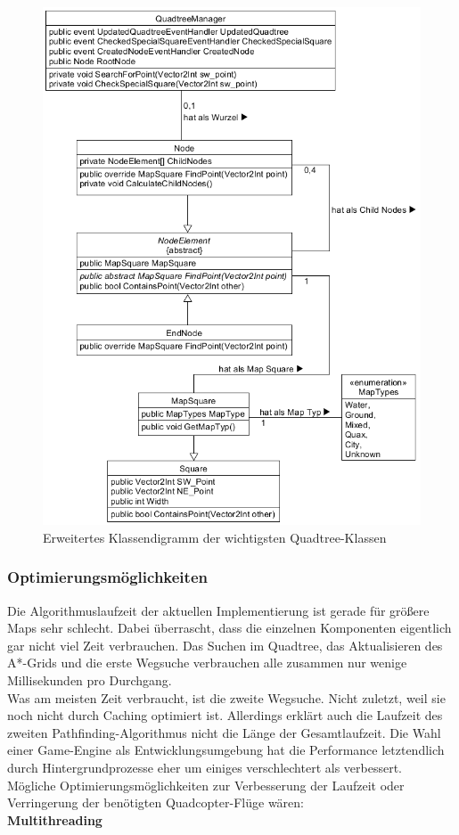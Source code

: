 \documentclass[a4paper,12pt]{article}
\begin{document}
\begin{figure}[H]
    \centering
    \includegraphics[width=1\linewidth]{Bilder/Aufgabe3/Klassendiagramm_Quadtree.png}
    \caption{Erweitertes Klassendigramm der wichtigsten Quadtree-Klassen}
\end{figure}

\subsubsection{Optimierungsmöglichkeiten}
Die Algorithmuslaufzeit der aktuellen Implementierung ist gerade für größere Maps sehr schlecht. Dabei überrascht, dass die einzelnen Komponenten eigentlich gar nicht viel Zeit verbrauchen. Das Suchen im Quadtree, das Aktualisieren des A*-Grids und die erste Wegsuche verbrauchen alle zusammen nur wenige Millisekunden pro Durchgang. 
\\[0.4cm]
Was am meisten Zeit verbraucht, ist die zweite Wegsuche. Nicht zuletzt, weil sie noch nicht durch Caching optimiert ist. Allerdings erklärt auch die Laufzeit des zweiten Pathfinding-Algorithmus nicht die Länge der Gesamtlaufzeit. Die Wahl einer Game-Engine als Entwicklungsumgebung hat die Performance letztendlich durch Hintergrundprozesse eher um einiges verschlechtert als verbessert.
\\[0.4cm]
Mögliche Optimierungsmöglichkeiten zur Verbesserung der Laufzeit oder Verringerung der benötigten Quadcopter-Flüge wären:
\\[0.4cm]
\textbf{Multithreading}
\end{document}
